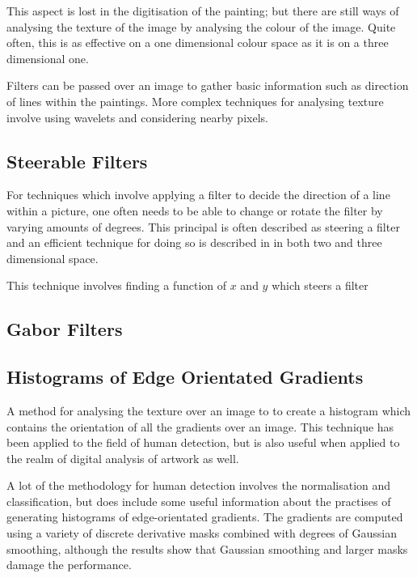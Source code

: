 \documentclass[conference]{IEEEtran}
\begin{document}
This aspect is lost in the digitisation of the painting; but there are still
ways of analysing the texture of the image by analysing the colour of the
image. Quite often, this is as effective on a one dimensional colour space as
it is on a three dimensional one.

Filters can be passed over an image to gather basic information such as
direction of lines within the paintings. More complex techniques for analysing
texture involve using wavelets and considering nearby pixels.

\subsection{Steerable Filters}

For techniques which involve applying a filter to decide the direction of a
line within a picture, one often needs to be able to change or rotate the
filter by varying amounts of degrees. This principal is often described as
steering a filter and an efficient technique for doing so is described in 
\cite{freeman91design} in both two and three dimensional space.

This technique involves finding a function of $x$ and $y$ which steers a filter


\subsection{Gabor Filters}


\subsection{Histograms of Edge Orientated Gradients}

A method for analysing the texture over an image to to create a histogram which
contains the orientation of all the gradients over an image. This technique has
been applied to the field of human detection\cite{dalal05histograms}, but is
also useful when applied to the realm of digital analysis of artwork as well.

A lot of the methodology for human detection involves the normalisation and
classification, but does include some useful information about the practises of
generating histograms of edge-orientated gradients. The gradients are computed
using a variety of discrete derivative masks combined with degrees of Gaussian
smoothing, although the results show that Gaussian smoothing and larger masks
damage the performance.
\end{document}
